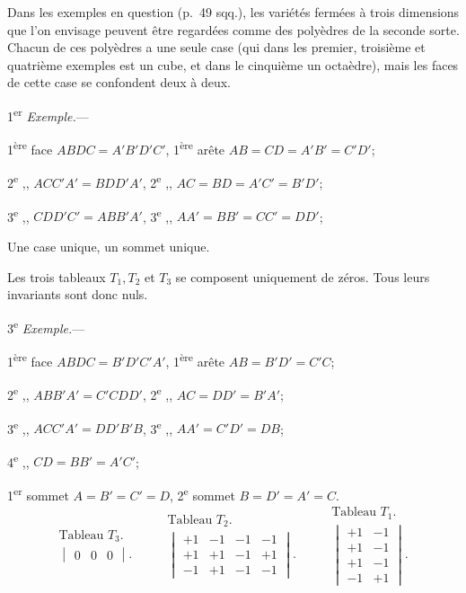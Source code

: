 \documentclass{article}
\begin{document}
Dans les exemples en question (p.\ 49 sqq.), les variétés fermées à
trois dimensions que l'on envisage peuvent être regardées comme des polyèdres de la seconde sorte. Chacun de ces polyèdres a une seule case (qui dans les premier, troisième et quatrième exemples est un cube, et dans le cinquième un octaèdre), mais les faces de cette case se confondent deux à deux.

1\textsuperscript{er} \emph{Exemple.}---

1\textsuperscript{ère} face $ABDC = A'B'D'C'$, 1\textsuperscript{ère} arête $AB = CD = A'B' = C'D'$;

2\textsuperscript{e} ,, $ACC'A' = BDD'A'$, 2\textsuperscript{e} ,, $AC = BD = A'C' = B'D'$;

3\textsuperscript{e} ,, $CDD'C' = ABB'A'$, 3\textsuperscript{e} ,, $AA' = BB' = CC' = DD'$;

Une case unique, un sommet unique.

Les trois tableaux $T_{1}, T_{2}$ et $T_{3}$ se composent uniquement de zéros. Tous leurs invariants sont donc nuls.

3\textsuperscript{e} \emph{Exemple.}---

1\textsuperscript{ère} face $ABDC = B'D'C'A'$, 1\textsuperscript{ère} arête $AB = B'D' = C'C$;

2\textsuperscript{e} ,, $ABB'A' = C'CDD'$, 2\textsuperscript{e} ,, $AC = DD' = B'A'$;

3\textsuperscript{e} ,, $ACC'A' = DD'B'B$, 3\textsuperscript{e} ,, $AA' = C'D' = DB$;

4\textsuperscript{e} ,, $CD = BB' = A'C'$;

1\textsuperscript{er} sommet $A = B' = C' = D$, 2\textsuperscript{e} sommet $B = D' = A' = C$.
\[ \begin{gathered} \text{Tableau } T_{3}. \\ \begin{vmatrix} 0 & 0 & 0 \end{vmatrix}. \end{gathered} \qquad \begin{gathered} \text{Tableau } T_{2}. \\ \begin{vmatrix} +1 & -1 & -1 & -1 \\[1ex] +1 & +1 & -1 & +1 \\[1ex] -1 & +1 & -1 & -1 \end{vmatrix}. \end{gathered} \qquad \begin{gathered} \text{Tableau } T_{1}. \\ \begin{vmatrix} +1 & -1 \\[1ex] +1 & -1 \\[1ex] +1 & -1 \\[1ex] -1 & +1 \end{vmatrix}. \end{gathered} \]
\end{document}
